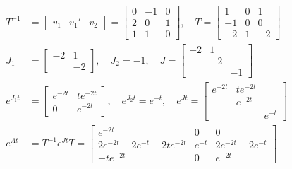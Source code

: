 \documentclass[a4paper,10.5pt]{article}
\begin{document}
\begin{align*}
T^{-1} &= \begin{bmatrix}
v_1 & v_1' & v_2
\end{bmatrix} = \begin{bmatrix}
0 & -1 & 0 \\
2 & 0 & 1 \\
1 & 1 & 0
\end{bmatrix}, \quad
T = \begin{bmatrix}
1 & 0 & 1 \\
-1 & 0 & 0 \\
-2 & 1 & -2
\end{bmatrix} \\
J_1 &= \begin{bmatrix}
-2 & 1  \\
& -2 \end{bmatrix}, \quad J_2 = -1, \quad
J = \begin{bmatrix}
-2 & 1 &  \\
 & -2 &  \\
 &  & -1
\end{bmatrix} \\
e^{J_1t} &= \begin{bmatrix}
e^{-2t} & te^{-2t} \\
0 & e^{-2t}
\end{bmatrix}, \quad e^{J_2t} = e^{-t}, \quad 
e^{Jt} = \begin{bmatrix}
e^{-2t} & te^{-2t} &\\
 & e^{-2t} & \\
& & e^{-t}
\end{bmatrix} \\
e^{At} &= T^{-1}e^{Jt}T = \begin{bmatrix}
e^{-2t} & 0 & 0\\
2e^{-2t}-2e^{-t}-2te^{-2t} & e^{-t} & 2e^{-2t}-2e^{-t} \\
-te^{-2t} & 0 & e^{-2t} \end{bmatrix}
\end{align*}

\clearpage
\end{document}

